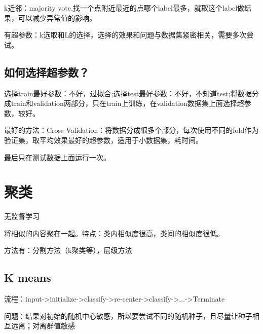 \documentclass[UTF8]{ctexart}
\begin{document}
k近邻：majority vote,找一个点附近最近的点哪个label最多，就取这个label做结果，可以减少异常值的影响。

有超参数：k选取和L的选择，选择的效果和问题与数据集紧密相关，需要多次尝试。

\subsection{如何选择超参数？}
选择train最好参数：不好，过拟合;选择test最好参数：不好，不知道test;将数据分成train和validation两部分，只在train上训练，在validation数据集上面选择超参数，较好。

最好的方法：Cross Validation：将数据分成很多个部分，每次使用不同的fold作为验证集，取平均效果最好的超参数，适用于小数据集，耗时间。

最后只在测试数据上面运行一次。

\section{聚类}
无监督学习

将相似的内容聚在一起。特点：类内相似度很高，类间的相似度很低。

方法有：分割方法（k聚类等），层级方法

\subsection{K means}
流程：input->initialize->classify->re-center->classify->...->Terminate

问题：结果对初始的随机中心敏感，所以要尝试不同的随机种子，且尽量让种子相互远离；对离群值敏感
\end{document}
